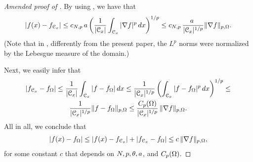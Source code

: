 \documentclass[a4paper,10pt]{amsart}
\numberwithin{equation}{section}
\begin{document}
\begin{proof}[Amended proof of {\cite[Corollary 2.3]{MP6}}]
	By using \cite[(2.3)]{MP6}, we have that 
$$
| f(x) - f_{\mathcal{C}_x}|
\le c_{N,p}\,a
\left( \frac{1}{|\mathcal{C}_x|}  \int_{\mathcal{C}_x} | \nabla f |^p \, dx \right)^{1/p}
\le c_{N,p}\,\frac{a\ }{|\mathcal{C}_x|^{1/p}} \Vert\nabla f\Vert_{p,\Omega}.
$$
(Note that in \cite{MP6}, differently from the present paper, the $L^p$ norms were normalized by the Lebesgue measure of the domain.)
\par
Next, we easily infer that	
\begin{multline*}
|f_{\mathcal{C}_x} - f_\Omega| \le \frac{1}{|\mathcal{C}_x|} \int_{\mathcal{C}_x} | f - f_\Omega | \, dx
\le \frac{1}{|\mathcal{C}_x|^{1/p}} \left( \int_{\mathcal{C}_x} | f - f_\Omega |^p \, dx \right)^{1/p} \le \\
\frac{1}{|\mathcal{C}_x|^{1/p}} \Vert f - f_\Omega\Vert_{p,\Omega} 
\le \frac{C_p(\Omega)}{|\mathcal{C}_x|^{1/p}}\, \Vert \nabla f\Vert_{p,\Omega}.
\end{multline*}
All in all, we conclude that
$$
| f(x) - f_{\Omega}|\le | f(x) - f_{\mathcal{C}_x}|+|f_{\mathcal{C}_x} - f_\Omega|  \le c \, \Vert \nabla f\Vert_{p,\Omega},
$$
for some constant $c$ that depends on $N, p, \theta, a$, and $C_p(\Omega)$.     
\end{proof}
 
\end{document}
